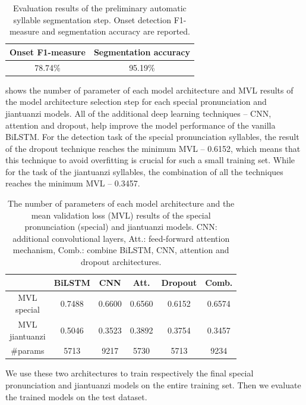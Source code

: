 \begin{table}[ht!]
\centering
\caption{Evaluation results of the preliminary automatic syllable segmentation step. Onset detection F1-measure and segmentation accuracy are reported.}
\label{tab:ch6:syllable_segmentation_results}
\begin{tabular}{cc}
\toprule
Onset F1-measure & Segmentation accuracy \\
\midrule
78.74\% & 95.19\% \\
\bottomrule
\end{tabular}
\end{table}

 shows the number of parameter of each model architecture and MVL results of the model architecture selection step for each special pronunciation and \gls{jiantuanzi} models. All of the additional deep learning techniques -- CNN, attention and dropout, help improve the model performance of the vanilla BiLSTM. For the detection task of the special pronunciation syllables, the result of the dropout technique reaches the minimum MVL -- 0.6152, which means that this technique to avoid overfitting is crucial for such a small training set. While for the task of the \gls{jiantuanzi} syllables, the combination of all the techniques reaches the minimum MVL -- 0.3457.  

\begin{table}[ht!]
\centering
\caption{The number of parameters of each model architecture and the mean validation loss (MVL) results of the special pronunciation (special) and jiantuanzi models. CNN: additional convolutional layers, Att.: feed-forward attention mechanism, Comb.: combine BiLSTM, CNN, attention and dropout architectures.}
\label{tab:ch6:results_discriminative_val}
\begin{tabular}{cccccc}
\toprule
& BiLSTM & CNN & Att. & Dropout & Comb. \\
\midrule
\makecell{MVL\\special} & 0.7488 & 0.6600 & 0.6560 & 0.6152 & 0.6574 \\
\makecell{MVL\\jiantuanzi} & 0.5046 & 0.3523 & 0.3892 & 0.3754 & 0.3457 \\
\#params & 5713 & 9217 & 5730 & 5713 & 9234 \\
\bottomrule
\end{tabular}
\end{table}

We use these two architectures to train respectively the final special pronunciation and \gls{jiantuanzi} models on the entire training set. Then we evaluate the trained models on the test dataset.

